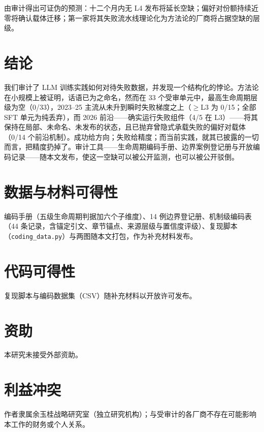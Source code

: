 \documentclass[10pt,fontset=fandol]{ctexart}
\begin{document}
由审计得出可证伪的预测：十二个月内无 L4 发布将延长空缺；偏好对份额持续近零将确认载体迁移；第一家将其失败流水线理论化为方法论的厂商将占据空缺的层级。

\section{结论}\label{sec:conclusion}

我们审计了 LLM 训练实践如何对待失败数据，并发现一个结构化的悖论。方法论在小规模上被证明，话语已为之命名，然而在 33 个受审单元中，最高生命周期层级为空（0/33），2023--25 主流从未升到瞬时失败梯度之上（$\ge$L3 为 0/15；全部 SFT 单元为纯丢弃），而 2026 前沿——确实运行失败组件（4/5 在 L3）——将其保持在局部、未命名、未发布的状态，且已抛弃曾隐式承载失败的偏好对载体（0/14 个前沿机制）。成功给方向；失败给精度；而当前实践，就其已披露的一切而言，把精度扔掉了。审计工具——生命周期编码手册、边界案例登记册与开放编码记录——随本文发布，使这一空缺可以被公开监测，也可以被公开驳倒。

\section*{数据与材料可得性}

编码手册（五级生命周期判据加六个子维度）、14 例边界登记册、机制级编码表（44 条记录，含锚定引文、章节锚点、来源层级与置信度评级）、复现脚本（\texttt{coding\_data.py}）与两图随本文打包，作为补充材料发布。

\section*{代码可得性}

复现脚本与编码数据集（CSV）随补充材料以开放许可发布。 %

\section*{资助}

本研究未接受外部资助。 %

\section*{利益冲突}

作者隶属余玉桂战略研究室（独立研究机构）；与受审计的各厂商不存在可能影响本工作的财务或个人关系。 %



\end{document}
